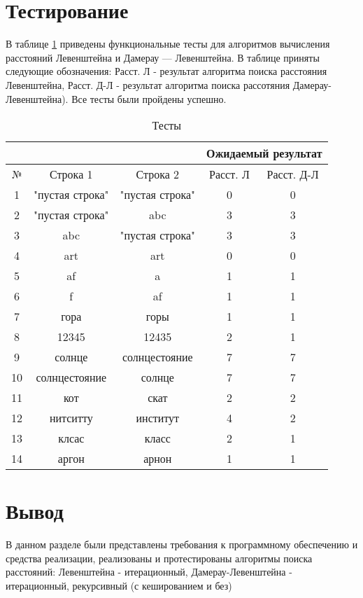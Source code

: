 \section{Тестирование}

В таблице \ref{test} приведены функциональные тесты для алгоритмов вычисления расстояний Левенштейна и Дамерау — Левенштейна. В таблице приняты следующие обозначения: Расст. Л - результат алгоритма поиска расстояния Левенштейна, Расст. Д-Л - результат алгоритма поиска рассотяния Дамерау-Левенштейна). Все тесты были пройдены успешно.

\begin{table}[h]
	\begin{center}
		\caption{\label{test} Тесты}
		\begin{tabular}{|c|c|c|c|c|}
			\hline
			& & & \multicolumn{2}{c|}{\bfseries Ожидаемый результат}    \\ \cline{3-4}\hline
			№ & Строка 1& Строка 2 & Расст. Л & Расст. Д-Л \\ [0.5ex] 
			\hline
			1 & "пустая строка" & "пустая строка" & 0 & 0\\
			\hline
			2 & "пустая строка" & abc & 3 & 3\\
			\hline
			3 & abc & "пустая строка" & 3 & 3\\
			\hline
			4 & art & art & 0 & 0\\
			\hline
			5 & af & a & 1 & 1\\
			\hline
			6 & f & af & 1 & 1\\
			\hline
			7 & гора & горы & 1 & 1\\
			\hline
			8 & 12345 & 12435 & 2 & 1\\
			\hline
			9 & солнце & солнцестояние & 7 & 7\\
			\hline
			10 & солнцестояние & солнце & 7 & 7\\
			\hline
			11 & кот & скат & 2 & 2\\
			\hline
			12 & нитситту & институт & 4 & 2\\
			\hline
			13 & клсас & класс & 2 & 1\\
			\hline
			14 & аргон & арнон & 1 & 1\\
			\hline
		\end{tabular}
	\end{center}
\end{table}


\section*{Вывод}

В данном разделе были представлены требования к программному обеспечению и средства реализации, реализованы и протестированы алгоритмы поиска расстояний: Левенштейна - итерационный, Дамерау-Левенштейна - итерационный, рекурсивный (с кешированием и без)

